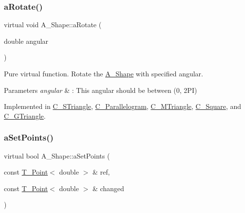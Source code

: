 \mbox{\label{classA__Shape_a25b4e0c34cdb46da5382fe9c7467efaf}} 
\subsubsection{\texorpdfstring{a\+Rotate()}{aRotate()}}
{\footnotesize\ttfamily virtual void A\+\_\+\+Shape\+::a\+Rotate (\begin{DoxyParamCaption}\item[{double}]{angular }\end{DoxyParamCaption})\hspace{0.3cm}{\ttfamily [pure virtual]}}



Pure virtual function. Rotate the \hyperlink{classA__Shape}{A\+\_\+\+Shape} with specified angular. 


\begin{DoxyParams}{Parameters}
{\em angular} & \+: This angular should be between (0, 2\+PI) \\
\hline
\end{DoxyParams}


Implemented in \hyperlink{classC__STriangle_a52612242aba17043862355c030637a18}{C\+\_\+\+S\+Triangle}, \hyperlink{classC__Parallelogram_a07b6dfae7100a409cdcf04d710ac9c3f}{C\+\_\+\+Parallelogram}, \hyperlink{classC__MTriangle_a33aa36879be70b0a11863801da56e92e}{C\+\_\+\+M\+Triangle}, \hyperlink{classC__Square_af74175a5e8d61216d68fde18ef9c9481}{C\+\_\+\+Square}, and \hyperlink{classC__GTriangle_a29c641aea4ef5fa4224b42dffc5fefa5}{C\+\_\+\+G\+Triangle}.

\mbox{\label{classA__Shape_a6996f454b337f8425ad13cba3f7a7c35}} 
\subsubsection{\texorpdfstring{a\+Set\+Points()}{aSetPoints()}}
{\footnotesize\ttfamily virtual bool A\+\_\+\+Shape\+::a\+Set\+Points (\begin{DoxyParamCaption}\item[{const \hyperlink{classT__Point}{T\+\_\+\+Point}$<$ double $>$ \&}]{ref,  }\item[{const \hyperlink{classT__Point}{T\+\_\+\+Point}$<$ double $>$ \&}]{changed }\end{DoxyParamCaption})\hspace{0.3cm}{\ttfamily [pure virtual]}}



